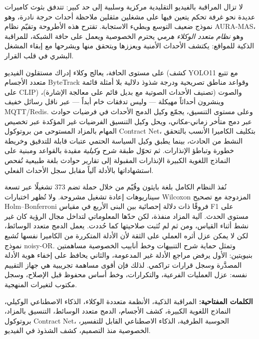 \documentclass[openany,12pt,oneside]{extreport}
\begin{document}
\begin{Arabic}
	لا تزال المراقبة بالفيديو التقليدية مركزية وسلبية إلى حد كبير: تتدفق بثوث كاميرات عديدة نحو غرفة تحكم يتعين فيها على مشغلين مثقلين ملاحظة أحداث حرجة نادرة، وهو نموذج ضعيف التوسع وبطيء الاستجابة. تقترح هذه الأطروحة وتقيّم نظام \textenglish{AURA-MAS}، وهو \emph{نظام متعدد الوكلاء هرمي} يحترم الخصوصية ويعمل على حافة الشبكة، للمراقبة الذكية للمواقع: يكتشف الأحداث الأمنية ويعززها ويتحقق منها ويشرحها مع إبقاء المشغل البشري في قلب القرار.

	على مستوى الحافة، يعالج وكلاء إدراك مستقلون الفيديو (كشف \textenglish{YOLO11} مع تتبع متعدد الأجسام \textenglish{ByteTrack} وقواعد مناطق تصريحية ودرجة شذوذ دلالية بلا أمثلة قائمة على \textenglish{CLIP}) والصوت (تصنيف الأحداث الصوتية مع بديل قائم على معالجة الإشارة)، وينشرون أحداثاً مهيكلة --- وليس تدفقات خام أبداً --- عبر ناقل رسائل خفيف \textenglish{MQTT/Redis}. وعلى مستوى التنسيق، يجمّع وكيل الدمج الأحداث في فرضيات حوادث عبر دمج متأخر زماني-مكاني، ويحل وكيل التنسيق الفرضيات غير المؤكدة عبر تخصيص المهام بالمزاد المستوحى من بروتوكول \textenglish{Contract Net}، بتكليف الكاميرا الأنسب بالتحقق النشط من الحادث، بينما يطبق وكيل السياسة الحتمي عتبات قابلة للتدقيق وخريطة خطورة وتباطؤ الإنذارات. ثم تحوّل طبقة شرح \emph{وكيلية} مقيدة بالقواعد ومبنية على النماذج اللغوية الكبيرة الإنذارات المقبولة إلى تقارير حوادث بلغة طبيعية تُفحص استشهاداتها بالأدلة آلياً مقابل سجل الأحداث الفعلي.

	نُفذ النظام الكامل بلغة بايثون وقُيّم من خلال حملة تضم \textenglish{373} تشغيلًا عبر تسعة سيناريوهات إعادة تشغيل مشروحة. ولا تُظهر اختبارات \textenglish{Wilcoxon} المزدوجة مع تصحيح \textenglish{Holm--Bonferroni} فروقًا ذات دلالة إحصائية بين البنى الأربع في مقياس \textenglish{F1} على مستوى الحدث. آلية المزاد منفذة، لكن حدّها المعلوماتي لتداخل مجال الرؤية كان غير نشط أثناء القياس، ومن ثم لم تُثبت صلاحيتها كما حُددت. يعمل الدمج متعدد الوسائط، لكن لا يمكن عزل أثره العملي على الثقة لأن الأدلة المتكررة من الكاميرا نفسها تُشبع نموذج \textenglish{noisy-OR}. وتمثل حماية شرح التنبيهات وخط أنابيب الخصوصية مساهمتين بنيويتين: الأول يرفض مراجع الأدلة غير المدعومة، والثاني يحافظ على إخفاء هوية الأدلة المصدَّرة وسجل قرارات تراكمي. لذلك فإن أقوى مساهمة تجريبية هي جهاز التقييم نفسه: عزل العمليات الفرعية، والتكرارات، وخط أساس محفوظ قبل الإصلاح، وسجل مكتوب لتغيرات المنهجية.

	\vskip 0.5cm
		{\small \textbf{الكلمات المفتاحية:} المراقبة الذكية، الأنظمة متعددة الوكلاء، الذكاء الاصطناعي الوكيلي، النماذج اللغوية الكبيرة، كشف الأجسام، الدمج متعدد الوسائط، التنسيق بالمزاد، بروتوكول \textenglish{Contract Net}، الحوسبة الطرفية، الذكاء الاصطناعي القابل للتفسير، الخصوصية منذ التصميم، كشف الشذوذ في الفيديو.}
\end{Arabic}
\end{document}
